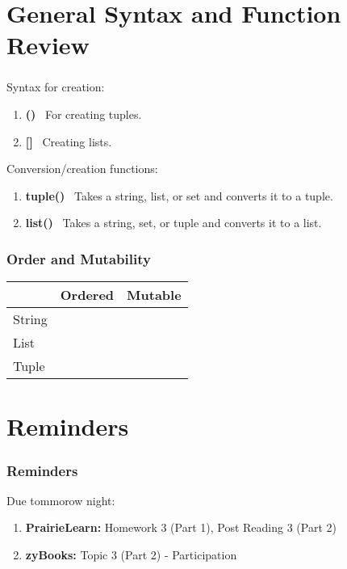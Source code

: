 \documentclass[xcolor=table]{beamer}
\begin{document}
\section{General Syntax and Function Review}

%
%
\begin{frame}[fragile]
  \frametitle{}
  Syntax for creation:
  \begin{enumerate}
    \item \textbf{()} \textrightarrow \ For creating tuples.
    \item \textbf{[]} \textrightarrow \ Creating lists.
  \end{enumerate}
  \vfill
  Conversion/creation functions:
  \begin{enumerate}
    \item \textbf{tuple()} \textrightarrow \ Takes a string, list, or set and converts it to a tuple.
    \item \textbf{list()} \ Takes a string, set, or tuple and converts it to a list.
  \end{enumerate}
\end{frame}

%
%
\begin{frame}[fragile]
  \frametitle{Order and Mutability}
  \begin{table}[]
    \begin{tabular}{l|l|l}
      \hline
      \multicolumn{1}{c|}{}       & \multicolumn{1}{c|}{Ordered}                  & \multicolumn{1}{c}{Mutable}                  \\ \hline
      \multicolumn{1}{c|}{String} & \multicolumn{1}{c|}{\cellcolor[HTML]{34FF34}} & \multicolumn{1}{c}{\cellcolor[HTML]{FE0000}} \\ \hline
      List                        & \cellcolor[HTML]{34FF34}                      & \cellcolor[HTML]{34FF34}                     \\ \hline
      Tuple                       & \cellcolor[HTML]{34FF34}                      & \cellcolor[HTML]{FE0000}                    
    \end{tabular}
  \end{table}
\end{frame}


\section{Reminders}

\begin{frame}
  \frametitle{Reminders}
  Due tommorow night:
  \begin{enumerate}
    \item \textbf{PrairieLearn: } Homework 3 (Part 1), Post Reading 3 (Part 2)
    \item \textbf{zyBooks: } Topic 3 (Part 2) - Participation
  \end{enumerate}
\end{frame}
\end{document}
